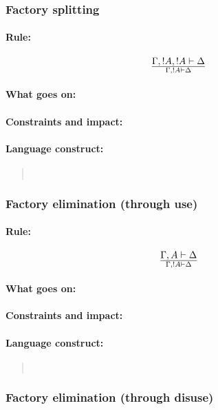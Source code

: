 \documentclass[a4paper]{article}
\begin{document}
\subsubsection{Factory splitting}
\paragraph{Rule:}
$$
{
  \Gamma, !A, !A \vdash \Delta
}\over{
  \Gamma, !A \vdash \Delta
}
$$
\paragraph{What goes on:}
\paragraph{Constraints and impact:}
\paragraph{Language construct:}
\begin{quote}\tt
\end{quote}

\subsubsection{Factory elimination (through use)}
\paragraph{Rule:}
$$
{
  \Gamma, A \vdash \Delta
}\over{
  \Gamma, !A \vdash \Delta
}
$$
\paragraph{What goes on:}
\paragraph{Constraints and impact:}
\paragraph{Language construct:}
\begin{quote}\tt
\end{quote}

\subsubsection{Factory elimination (through disuse)}
\end{document}
